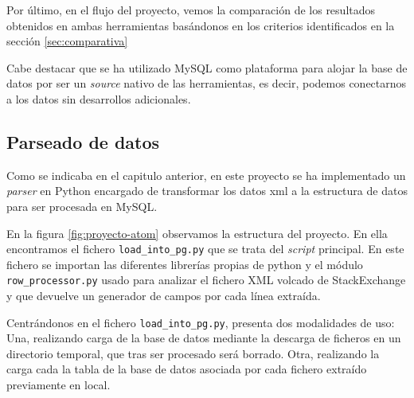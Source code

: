 \documentclass[a4paper, 12pt]{book}
\begin{document}

Por último, en el flujo del proyecto, vemos la comparación de los resultados obtenidos en ambas herramientas basándonos en los criterios identificados en la sección \ref{sec:comparativa}

Cabe destacar que se ha utilizado MySQL como plataforma para alojar la base de datos por ser un \emph{source} nativo de las herramientas, es decir, podemos conectarnos a los datos sin desarrollos adicionales.
\newpage
\subsection{Parseado de datos}
\label{sec:parser} 

Como se indicaba en el capitulo anterior, en este proyecto se ha implementado un \emph{parser} en Python encargado de transformar los datos \gls{xml} a la estructura de datos para ser procesada en MySQL. 

En la figura \ref{fig:proyecto-atom} observamos la estructura del proyecto. En ella encontramos el fichero \texttt{load\_into\_pg.py} que se trata del \emph{script} principal. En este fichero se importan las diferentes librerías propias de python y el módulo \texttt{row\_processor.py} usado para analizar el fichero XML volcado de StackExchange y que devuelve un generador de campos por cada línea extraída. 

Centrándonos en el fichero \texttt{load\_into\_pg.py}, presenta dos modalidades de uso: Una, realizando carga de la base de datos mediante la descarga de ficheros en un directorio temporal, que tras ser procesado será borrado. Otra, realizando la carga cada la tabla de la base de datos asociada por cada fichero extraído previamente en local. 
\end{document}
